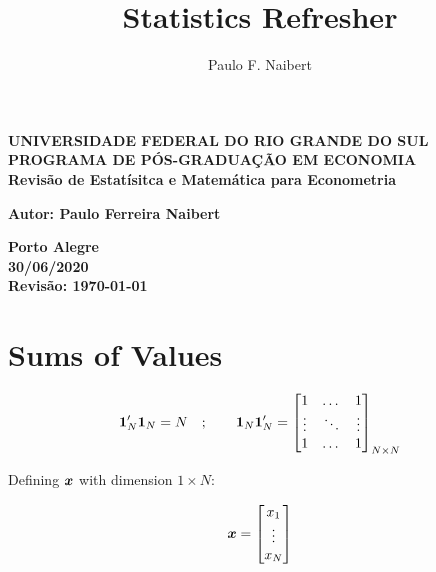 \documentclass[11pt,oneside,a4paper]{article}
\numberwithin{equation}{section}
\begin{document}
\title{Statistics Refresher}
\author{Paulo F. Naibert}

\thispagestyle{empty}

\begin{center}
\textbf{UNIVERSIDADE FEDERAL DO RIO GRANDE DO SUL}
\\
\textbf{PROGRAMA DE PÓS-GRADUAÇÃO EM ECONOMIA}
\\

\vfill
\textbf{Revisão de Estatísitca e Matemática para Econometria}

\vfill
\textbf{Autor: Paulo Ferreira Naibert } 

\end{center}

\vfill

\begin{center}
\textbf{Porto Alegre \\ 30/06/2020 \\ Revisão: \today}
\end{center}

\clearpage
{}

\section*{Sums of Values}
\noindent
\cite[p. 977, A.2.7]{greene-7ed}

\begin{align*}
\boldsymbol{1}_{N}' \boldsymbol{1}_{N} = N
\quad ; \qquad
\boldsymbol{1}_{N} \boldsymbol{1}_{N}' =
\begin{bmatrix}
	1 & \dots & 1	 \\
	\vdots & \ddots & \vdots \\
	1 & \dots & 1	
\end{bmatrix}_{N \times N}
\end{align*}

Defining $\boldsymbol{x}$ with dimension $1 \times N$:

\begin{align*}
\boldsymbol{x} = 
\begin{bmatrix}
x_{1} \\ \vdots \\ x_{N}	
\end{bmatrix}
\end{align*}
\end{document}
